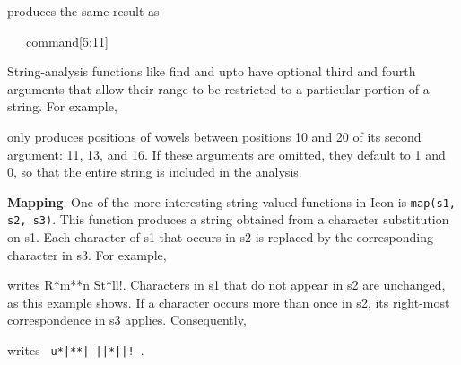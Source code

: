 \noindent produces the same result as


\ \ \ command[5:11]


String-analysis functions like find and upto have optional third and
fourth arguments that allow their range to be restricted to a
particular portion of a string. For example,



\noindent only produces positions of vowels between positions 10 and
20 of its second argument: 11, 13, and 16. If these arguments are
omitted, they default to 1 and 0, so that the entire string is
included in the analysis.


\textbf{Mapping}. One of the more interesting string-valued functions
in Icon is \texttt{map(s1, s2, s3)}. This function produces a string
obtained from a character substitution on s1. Each character of s1
that occurs in s2 is replaced by the corresponding character in
s3. For example,



\noindent writes R*m**n St*ll!. Characters in s1 that do not appear in
s2 are unchanged, as this example shows. If a character occurs more
than once in s2, its right-most correspondence in s3
applies. Consequently,


\noindent
writes \verb+ u*|**| ||*||! +.


